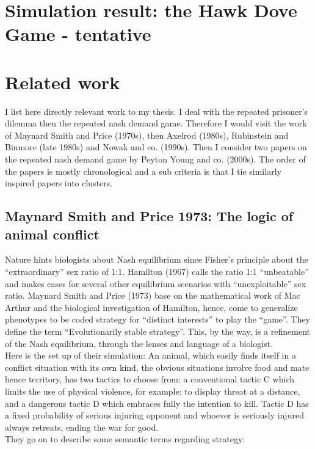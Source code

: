 \documentclass[12.5pt]{report}
\begin{document}
\chapter{Simulation result: the Hawk Dove Game - tentative}


\chapter{Related work}
I list here directly relevant work to my thesis. I deal with the repeated prisoner’s dilemma then the repeated nash demand game. Therefore I would visit the work of Maynard Smith and Price (1970s), then Axelrod (1980s), Rubinstein and Binmore (late 1980s) and Nowak and co. (1990s). Then I consider two papers on the repeated nash demand game by Peyton Young and co. (2000s). The order of the papers is mostly chronological and a sub criteria is that I tie similarly inspired papers into clusters.

\section{Maynard Smith and Price 1973: The logic of animal conflict}

Nature hints biologists about Nash equilibrium since Fisher’s principle about the “extraordinary” sex ratio of 1:1. Hamilton (1967) calls the ratio 1:1 “unbeatable” and makes cases for several other equilibrium scenarios with “unexploitable” sex ratio. Maynard Smith and Price (1973) base on the mathematical work of Mac Arthur and the biological investigation of Hamilton, hence, come to generalize phenotypes to be coded strategy for “distinct interests” to play the “game”. They define the term “Evolutionarily stable strategy”. This, by the way, is a refinement of the Nash equilibrium, through the lenses and language of a biologist.\\

Here is the set up of their simulation:
An animal, which easily finds itself in a conflict situation with its own kind, the obvious situations involve food and mate hence territory, has two tactics to choose from: a conventional tactic C which limits the use of physical violence, for example: to display threat at a distance, and a dangerous tactic D which embraces fully the intention to kill. 
 Tactic D has a fixed probability of serious injuring opponent and whoever is seriously injured always retreats, ending the war for good.\\

They go on to describe some semantic terms regarding strategy:
\end{document}
